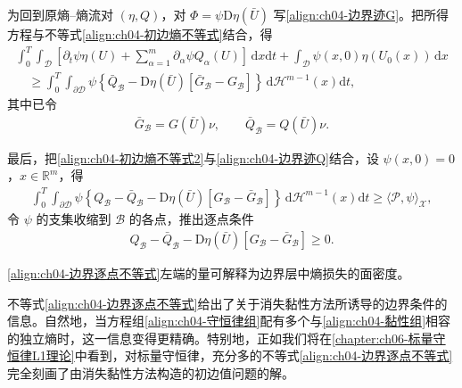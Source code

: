 \documentclass[../../main.tex]{subfiles}
\begin{document}
为回到原熵--熵流对 $(\eta,Q)$，对 $\Phi=\psi\mathrm{D}\eta(\bar{U})$ 写\eqref{align:ch04-边界迹G}。把所得方程与不等式\eqref{align:ch04-初边熵不等式}结合，得
\begin{align}
\int_{0}^{T}\int_{\mathscr{D}}\left[\partial_{t}\psi\eta(U)+\sum_{\alpha=1}^{m}\partial_{\alpha}\psi Q_{\alpha}(U)\right]\,\mathrm{d}x\mathrm{d}t+\int_{\mathscr{D}}\psi(x,0)\eta(U_{0}(x))\,\mathrm{d}x\nonumber\\
\quad\geqslant\int_{0}^{T}\int_{\partial\mathscr{D}}\psi\left\{\bar{Q}_{\mathscr{B}}-\mathrm{D}\eta(\bar{U})[\bar{G}_{\mathscr{B}}-G_{\mathscr{B}}]\right\}\,\mathrm{d}\mathscr{H}^{m-1}(x)\mathrm{d}t,
\label{align:ch04-初边熵不等式2}
\end{align}
其中已令
\begin{align}
\bar{G}_{\mathscr{B}}=G(\bar{U})\nu,\qquad \bar{Q}_{\mathscr{B}}=Q(\bar{U})\nu.
\label{align:ch04-边界常状态}
\end{align}

最后，把\eqref{align:ch04-初边熵不等式2}与\eqref{align:ch04-边界迹Q}结合，设 $\psi(x,0)=0$，$x\in\mathbb{R}^{m}$，得
\begin{align}
\int_{0}^{T}\int_{\partial\mathscr{D}}\psi\left\{Q_{\mathscr{B}}-\bar{Q}_{\mathscr{B}}-\mathrm{D}\eta(\bar{U})[G_{\mathscr{B}}-\bar{G}_{\mathscr{B}}]\right\}\,\mathrm{d}\mathscr{H}^{m-1}(x)\mathrm{d}t\geqslant\langle\mathscr{P},\psi\rangle_{\mathscr{X}},
\label{align:ch04-边界积分不等式}
\end{align}
令 $\psi$ 的支集收缩到 $\mathscr{B}$ 的各点，推出逐点条件
\begin{align}
Q_{\mathscr{B}}-\bar{Q}_{\mathscr{B}}-\mathrm{D}\eta(\bar{U})[G_{\mathscr{B}}-\bar{G}_{\mathscr{B}}]\geqslant 0.
\label{align:ch04-边界逐点不等式}
\end{align}

\eqref{align:ch04-边界逐点不等式}左端的量可解释为边界层中熵损失的面密度。

不等式\eqref{align:ch04-边界逐点不等式}给出了关于消失黏性方法所诱导的边界条件的信息。自然地，当方程组\eqref{align:ch04-守恒律组}配有多个与\eqref{align:ch04-黏性组}相容的独立熵时，这一信息变得更精确。特别地，正如我们将在\cref{chapter:ch06-标量守恒律L1理论}中看到，对标量守恒律，充分多的不等式\eqref{align:ch04-边界逐点不等式}完全刻画了由消失黏性方法构造的初边值问题的解。
\end{document}
